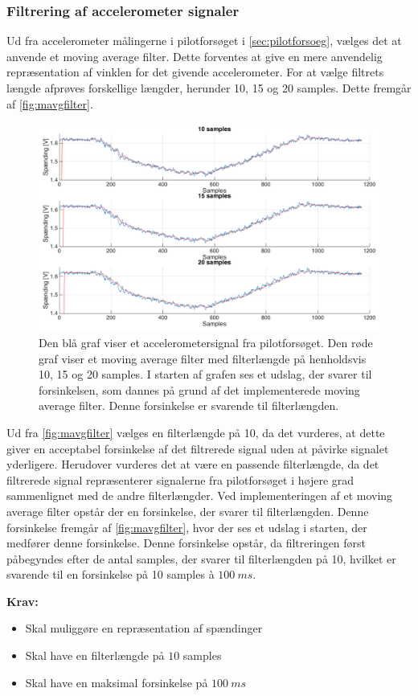 \subsubsection{Filtrering af accelerometer signaler} \label{sec:mavg_krav}
Ud fra accelerometer målingerne i pilotforsøget i \autoref{sec:pilotforsoeg}, vælges det at anvende et moving average filter. Dette forventes at give en mere anvendelig repræsentation af vinklen for det givende accelerometer. For at vælge filtrets længde afprøves forskellige længder, herunder 10, 15 og 20 samples. Dette fremgår af \autoref{fig:mavgfilter}.


\begin{figure} [H]
\centering
\includegraphics[width=1\textwidth]{figures/problemloesning/mavgfilter_matlab} 
\caption{Den blå graf viser et accelerometersignal fra pilotforsøget. Den røde graf viser et moving average filter med filterlængde på henholdsvis 10, 15 og 20 samples. I starten af grafen ses et udslag, der svarer til forsinkelsen, som dannes på grund af det implementerede moving average filter. Denne forsinkelse er svarende til filterlængden.}
\label{fig:mavgfilter}
\end{figure}

Ud fra \autoref{fig:mavgfilter} vælges en filterlængde på 10, da det vurderes, at dette giver en acceptabel forsinkelse af det filtrerede signal uden at påvirke signalet yderligere. Herudover vurderes det at være en passende filterlængde, da det filtrerede signal repræsenterer signalerne fra pilotforsøget i højere grad sammenlignet med de andre filterlængder. Ved implementeringen af et moving average filter opstår der en forsinkelse, der svarer til filterlængden. Denne forsinkelse fremgår af \autoref{fig:mavgfilter}, hvor der ses et udslag i starten, der medfører denne forsinkelse. Denne forsinkelse opstår, da filtreringen først påbegyndes efter de antal samples, der svarer til filterlængden på 10, hvilket er svarende til en forsinkelse på 10 samples à $100~ms$. 


\vspace{3mm}
\textbf{Krav:}
\begin{itemize}
\item Skal muliggøre en repræsentation af spændinger 
\item Skal have en filterlængde på $10$ samples
\item Skal have en maksimal forsinkelse på $100~ms$
\end{itemize}
